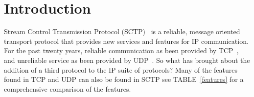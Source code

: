 \documentclass[conference]{IEEEtran}
\begin{document}




%



\section{Introduction}
Stream Control Transmission Protocol (SCTP)~\cite{rfc4960} is a reliable, message oriented
transport protocol that provides new services and features for IP communication.
For the past twenty years, reliable communication as been provided by TCP~\cite{rfc793}, and unreliable service as been provided by UDP~\cite{rfc768}.
So what has brought about the addition of a third protocol to the IP suite of protocols? Many of the features found in TCP and UDP can also be found in SCTP
see TABLE~\ref{features} for a comprehensive comparison of the features. 
\end{document}
